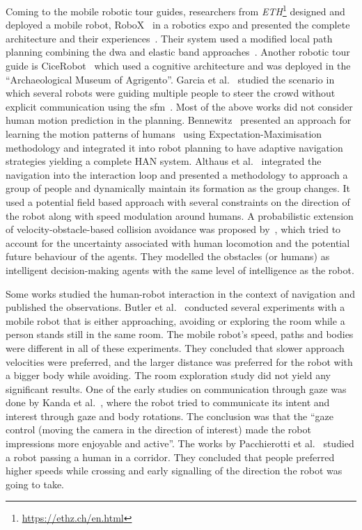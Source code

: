 Coming to the mobile robotic tour guides, researchers from \textit{ETH}\footnote{\url{https://ethz.ch/en.html}} designed and deployed a mobile robot, RoboX~\cite{arras2003robox} in a robotics expo and presented the complete architecture and their experiences~\cite{siegwart2003design, jensen2005robots}. Their system used a modified local path planning combining the \acrshort{dwa} and elastic band approaches~\cite{philippsen2003smooth}. Another robotic tour guide is CiceRobot~\cite{macaluso2005experiences} which used a cognitive architecture and was deployed in the ``Archaeological Museum of Agrigento''. Garcia et al.~\cite{martinez2005crowding} studied the scenario in which several robots were guiding multiple people to steer the crowd without explicit communication using the \acrfull{sfm}~\cite{helbing1995social}.  Most of the above works did not consider human motion prediction in the planning. Bennewitz~\cite{bennewitz2004mobile} presented an approach for learning the motion patterns of humans~\cite{bennewitz2005learning} using Expectation-Maximisation methodology and integrated it into robot planning to have adaptive navigation strategies yielding a complete HAN system. Althaus et al.~\cite{althaus2004navigation} integrated the navigation into the interaction loop and presented a methodology to approach a group of people and dynamically maintain its formation as the group changes. It used a potential field based approach with several constraints on the direction of the robot along with speed modulation around humans. A probabilistic extension of velocity-obstacle-based collision avoidance was proposed by~\cite{kluge2004reflective}, which tried to account for the uncertainty associated with human locomotion and the potential future behaviour of the agents. They modelled the obstacles (or humans) as intelligent decision-making agents with the same level of intelligence as the robot. 

Some works studied the human-robot interaction in the context of navigation and published the observations. Butler et al.~\cite{butler2001psychological} conducted several experiments with a mobile robot that is either approaching, avoiding or exploring the room while a person stands still in the same room. The mobile robot’s speed, paths and bodies were different in all of these experiments. They concluded that slower approach velocities were preferred, and the larger distance was preferred for the robot with a bigger body while avoiding. The room exploration study did not yield any significant results. One of the early studies on communication through gaze was done by Kanda et al.~\cite{kanda2001psychological}, where the robot tried to communicate its intent and interest through gaze and body rotations. The conclusion was that the “gaze control (moving the camera in the direction of interest) made the robot impressions more enjoyable and active”. The works by Pacchierotti et al.~\cite{pacchierotti2005human, pacchierotti2006evaluation} studied a robot passing a human in a corridor. They concluded that people preferred higher speeds while crossing and early signalling of the direction the robot was going to take.


